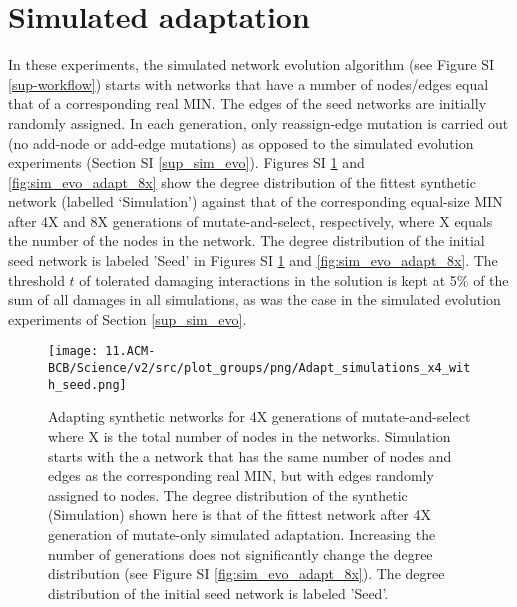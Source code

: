 \documentclass[12pt]{article}	%
\begin{document}
\section{Simulated adaptation}\label{sup_sim_adapt}
        In these experiments, the simulated network evolution algorithm (see Figure SI \ref{sup-workflow}) starts with networks that have a number of nodes/edges equal that of a corresponding real MIN. The edges of the seed networks are initially randomly assigned. In each generation, only reassign-edge mutation is carried out (no add-node or add-edge mutations) as opposed to the simulated evolution experiments (Section SI \ref{sup_sim_evo}). Figures SI \ref{fig:sim_evo_adapt_4x} and \ref{fig:sim_evo_adapt_8x} show the degree distribution of the fittest synthetic network (labelled `Simulation') against that of the corresponding equal-size MIN after 4X and 8X generations of mutate-and-select, respectively, where  X equals the number of the nodes in the network. The degree distribution of the initial seed network is labeled 'Seed' in Figures SI \ref{fig:sim_evo_adapt_4x} and \ref{fig:sim_evo_adapt_8x}. The threshold $t$ of tolerated damaging interactions in the solution is kept at 5\% of the sum of all damages in all simulations, as was the case in the simulated evolution experiments of Section \ref{sup_sim_evo}.

    	\begin{figure}[H]%
    			\centering
    					\texttt{[image: 11.ACM-BCB/Science/v2/src/plot\_groups/png/Adapt\_simulations\_x4\_with\_seed.png]}
    					\caption
                            {
                                Adapting synthetic networks for 4X generations of mutate-and-select where X is the total number of nodes in the networks. Simulation starts with the a network that has the same number of nodes and edges as the corresponding real MIN, but with edges randomly assigned to nodes. The  degree distribution of the synthetic (Simulation) shown here is that of the fittest network after 4X generation of mutate-only simulated adaptation. Increasing the number of generations does not significantly change the degree distribution (see Figure SI \ref{fig:sim_evo_adapt_8x}). The degree distribution of the initial seed network is labeled 'Seed'.
                            }
    					\label{fig:sim_evo_adapt_4x}
    	\end{figure}
\end{document}

